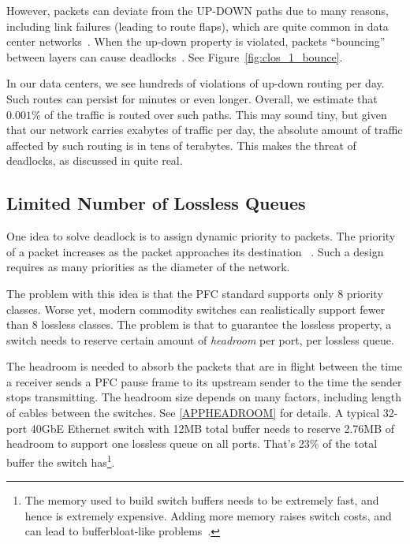 However, packets can deviate from the UP-DOWN paths due to many reasons,
including link failures (leading to route flaps), which are quite common in data
center networks~\cite{netpilot,f10}. When the up-down property is violated,
packets ``bouncing'' between layers can cause
deadlocks~\cite{shpiner2016unlocking}. See
Figure~\ref{fig:clos_1_bounce}.

In our data centers, we see hundreds of violations of up-down routing per
day. Such routes can persist for minutes or even longer. Overall, we estimate
that $0.001\%$ of the traffic is routed over such paths. This may sound tiny,
but given that our network carries exabytes of traffic per day, the absolute
amount of traffic affected by such routing is in tens of terabytes. This makes
the threat of deadlocks, as discussed
in\cite{rdmaatscale,shpiner2016unlocking,hu2016deadlocks} quite real.

\subsection{Limited Number of Lossless Queues}
\label{subsec:pfcheadroom}

One idea to solve deadlock is to assign dynamic priority to packets. The priority 
of a packet increases as the packet approaches its destination ~\cite{karol2003prevention}.
Such a design requires as many priorities as the diameter of the network.

The problem with this idea is that the PFC standard supports only 8 priority
classes. Worse yet, modern commodity switches can realistically support fewer
than 8 lossless classes.  The problem is that  to guarantee the lossless
property, a switch needs to reserve certain amount of {\it headroom} per port,
per lossless queue.

The headroom is needed to absorb the packets that are in flight between the time
a receiver sends a PFC pause frame to its upstream sender to the time the sender
stops transmitting.  The headroom size depends on many factors, including length
of cables between the switches. See \ref{APPHEADROOM} for details.  A typical
32-port 40GbE Ethernet switch with 12MB total buffer needs to reserve 2.76MB of
headroom to support one lossless queue on all ports. That's 23\% of the total
buffer the switch has\footnote{The memory used to build switch buffers needs to
be extremely fast, and hence is extremely expensive. Adding more memory raises
switch costs, and can lead to bufferbloat-like problems~\cite{dctcp}.}.

